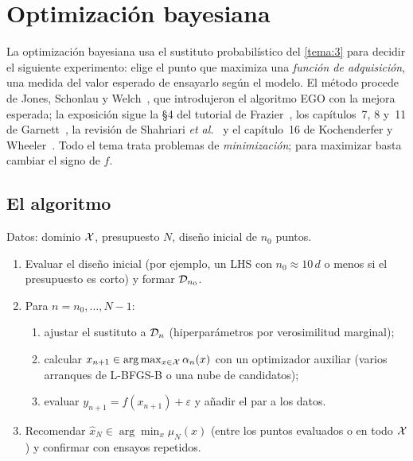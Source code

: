 \chapter{Optimización bayesiana}
\label{tema:4}

La optimización bayesiana usa el sustituto probabilístico del \cref{tema:3} para decidir el siguiente experimento: elige el punto que maximiza una \emph{función de adquisición}, una medida del valor esperado de ensayarlo según el modelo. El método procede de Jones, Schonlau y Welch~\cite{jones}, que introdujeron el algoritmo EGO con la mejora esperada; la exposición sigue la §4 del tutorial de Frazier~\cite{frazier}, los capítulos~7, 8 y~11 de Garnett~\cite{garnett}, la revisión de Shahriari \emph{et al.}~\cite{shahriari} y el capítulo~16 de Kochenderfer y Wheeler~\cite{kw}. Todo el tema trata problemas de \emph{minimización}; para maximizar basta cambiar el signo de $f$.

\section{El algoritmo}

\begin{algoritmo}\label{alg:bo}
Datos: dominio $\mathcal{X}$, presupuesto $N$, diseño inicial de $n_0$ puntos.
\begin{enumerate}[label=\arabic*.]
  \item Evaluar el diseño inicial (por ejemplo, un LHS con $n_0\approx 10\,d$ o menos si el presupuesto es corto) y formar $\mathcal{D}_{n_0}$.
  \item Para $n=n_0,\dots,N-1$:
  \begin{enumerate}[label=(\alph*)]
    \item ajustar el sustituto a $\mathcal{D}_n$ (hiperparámetros por verosimilitud marginal);
    \item calcular $x_{n+1}\in\arg\max_{x\in\mathcal{X}}\alpha_n(x)$ con un optimizador auxiliar (varios arranques de L-BFGS-B o una nube de candidatos);
    \item evaluar $y_{n+1}=f(x_{n+1})+\varepsilon$ y añadir el par a los datos.
  \end{enumerate}
  \item Recomendar $\hat x_N\in\arg\min_{x}\mu_N(x)$ (entre los puntos evaluados o en todo $\mathcal{X}$) y confirmar con ensayos repetidos.
\end{enumerate}
\end{algoritmo}

